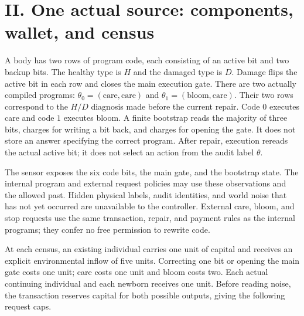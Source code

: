 \documentclass[
  english,
  11pt,
  oneside]{book}
\begin{document}
\section{II. One actual source: components, wallet, and census}\label{ii.-one-actual-source-components-wallet-and-census}

A body has two rows of program code, each consisting of an active bit and two backup bits. The healthy type is \(H\) and the damaged type is \(D\). Damage flips the active bit in each row and closes the main execution gate. There are two actually compiled programs: \(\theta_0=(\mathrm{care},\mathrm{care})\) and \(\theta_1=(\mathrm{bloom},\mathrm{care})\). Their two rows correspond to the \(H/D\) diagnosis made before the current repair. Code \(0\) executes care and code \(1\) executes bloom. A finite bootstrap reads the majority of three bits, charges for writing a bit back, and charges for opening the gate. It does not store an answer specifying the correct program. After repair, execution rereads the actual active bit; it does not select an action from the audit label \(\theta\).

The sensor exposes the six code bits, the main gate, and the bootstrap state. The internal program and external request policies may use these observations and the allowed past. Hidden physical labels, audit identities, and world noise that has not yet occurred are unavailable to the controller. External care, bloom, and stop requests use the same transaction, repair, and payment rules as the internal programs; they confer no free permission to rewrite code.

At each census, an existing individual carries one unit of capital and receives an explicit environmental inflow of five units. Correcting one bit or opening the main gate costs one unit; care costs one unit and bloom costs two. Each actual continuing individual and each newborn receives one unit. Before reading noise, the transaction reserves capital for both possible outputs, giving the following request caps.
\end{document}
